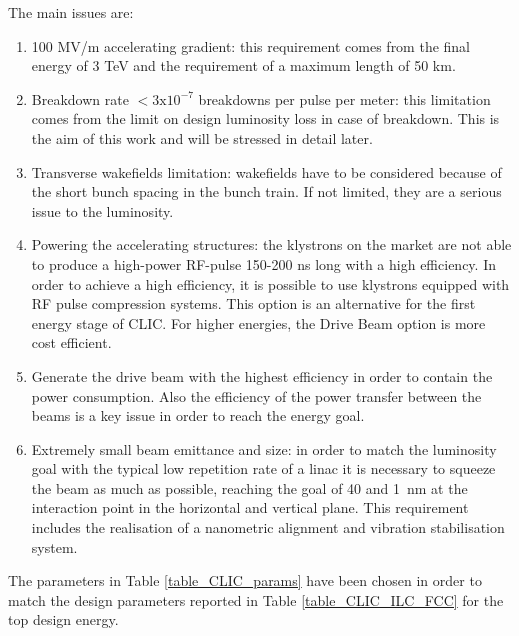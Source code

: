 The main issues are:

\begin{enumerate}
\item 100 MV/m accelerating gradient: this requirement comes from the final energy of 3 TeV and the requirement of a maximum length of 50 km.
\item Breakdown rate $< 3\text{x}10^{-7}$ breakdowns per pulse per meter: this limitation comes from the limit on design luminosity loss in case of breakdown. This is the aim of this work and will be stressed in detail later.
\item Transverse wakefields limitation: wakefields have to be considered because of the short bunch spacing in the bunch train. If not limited, they are a serious issue to the luminosity.
\item Powering the accelerating structures: the klystrons on the market are not able to produce a high-power RF-pulse 150-200 ns long with a high efficiency. In order to achieve a high efficiency, it is possible to use klystrons equipped with RF pulse compression systems. This option is an alternative for the first energy stage of CLIC. For higher energies, the Drive Beam option is more cost efficient.
\item Generate the drive beam with the highest efficiency in order to contain the power consumption. Also the efficiency of the power transfer between the beams is a key issue in order to reach the energy goal.
\item Extremely small beam emittance and size: in order to match the luminosity goal with the typical low repetition rate of a linac it is necessary to squeeze the beam as much as possible, reaching the goal of 40 and 1~nm at the interaction point in the horizontal and vertical plane. This requirement includes the realisation of a nanometric alignment and vibration stabilisation system.
\end{enumerate}



The parameters in Table \ref{table_CLIC_params} have been chosen in order to match the design parameters reported in Table \ref{table_CLIC_ILC_FCC} for the top design energy.


